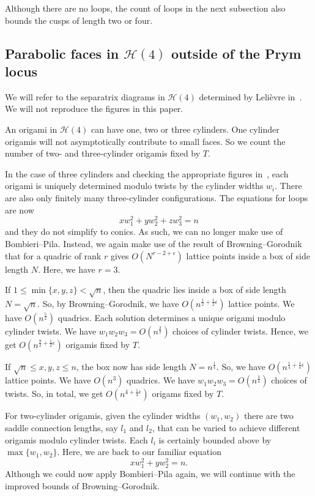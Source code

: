 \documentclass[a4paper,11pt]{amsart}
\numberwithin{equation}{section}
\numberwithin{figure}{section}
\numberwithin{table}{section}
\newcommand{\calH}{\mathcal{H}}
\begin{document}
Although there are no loops, the count of loops in the next subsection also bounds the cusps of length two or four.

\subsection{Parabolic faces in $\calH(4)$ outside of the Prym locus}\label{subsec:H4-paras}

We will refer to the separatrix diagrams in $\calH(4)$ determined by Leli\`evre in~\cite[Appendix C]{MMY}. We will not reproduce the figures in this paper.

An origami in $\calH(4)$ can have one, two or three cylinders. One cylinder origamis will not asymptotically contribute to small faces. So we count the number of two- and three-cylinder origamis fixed by $T$.

In the case of three cylinders and checking the appropriate figures in~\cite[Appendix C]{MMY}, each origami is uniquely determined modulo twists by the cylinder widths $w_i$. There are also only finitely many three-cylinder configurations. The equations for loops are now
\[xw_1^2+yw_2^2+zw_3^2 = n\]
and they do not simplify to conics. As such, we can no longer make use of Bombieri--Pila. Instead, we again make use of the result of Browning--Gorodnik~\cite[Theorem 1.11]{BG} that for a quadric of rank $r$ gives $O(N^{r-2+\epsilon})$ lattice points inside a box of side length $N$. Here, we have $r = 3$.

If $1\leq \min\{x,y,z\}< \sqrt{n}$, then the quadric lies inside a box of side length $N=\sqrt{n}$. So, by Browning--Gorodnik, we have $O(n^{\frac{1}{2}+\frac{1}{2}\epsilon})$ lattice points. We have $O(n^{\frac{5}{2}})$ quadrics. Each solution determines a unique origami modulo cylinder twists. We have $w_1w_2w_3 = O(n^{\frac{3}{2}})$ choices of cylinder twists. Hence, we get $O(n^{\frac{9}{2}+\frac{1}{2}\epsilon})$ origamis fixed by $T$.

If $\sqrt{n}\leq x, y, z\leq n$, the box now has side length $N = n^{\frac{1}{4}}$. So, we have $O(n^{\frac{1}{4}+\frac{1}{4}\epsilon})$ lattice points. We have $O(n^3)$ quadrics. We have $w_1w_2w_3 = O(n^{\frac{3}{4}})$ choices of twists. So, in total, we get $O(n^{4+\frac{1}{4}\epsilon})$ origams fixed by $T$.

For two-cylinder origamis, given the cylinder widths $(w_1,w_2)$ there are two saddle connection lengths, say $l_1$ and $l_2$, that can be varied to achieve different origamis modulo cylinder twists. Each $l_i$ is certainly bounded above by $\max\{w_1,w_2\}$. Here, we are back to our familiar equation
\[xw_1^2+yw_2^2 = n.\]
Although we could now apply Bombieri--Pila again, we will continue with the improved bounds of Browning--Gorodnik.
\end{document}
